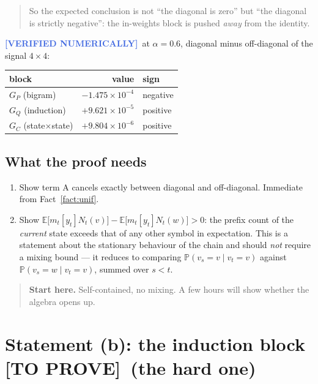 \documentclass[11pt,a4paper]{article}
\theoremstyle{plain}
\theoremstyle{definition}
\newcommand{\TODO}{\textcolor{BrickRed}{\textbf{[TO PROVE]}}}
\newcommand{\NUM}{\textcolor{RoyalBlue}{\textbf{[VERIFIED NUMERICALLY]}}}
\newcommand{\1}{\mathbf{1}}
\newcommand{\E}{\mathbb{E}}
\newcommand{\PP}{\mathbb{P}}
\begin{document}
\begin{quote}
So the expected conclusion is not ``the diagonal is zero'' but ``the diagonal is strictly
negative'': the in-weights block is pushed \emph{away} from the identity.
\end{quote}

\medskip\noindent\NUM\ at $\alpha=0.6$, diagonal minus off-diagonal of the signal $4\times4$:

\begin{center}
\begin{tabular}{@{}lrl@{}}
\toprule
block & value & sign \\
\midrule
$G_P$ (bigram) & $-1.475\times10^{-4}$ & negative \\
$G_Q$ (induction) & $+9.621\times10^{-5}$ & positive \\
$G_C$ (state$\times$state) & $+9.804\times10^{-6}$ & positive \\
\bottomrule
\end{tabular}
\end{center}

\subsection{What the proof needs}

\begin{enumerate}[nosep]
\item Show term A cancels exactly between diagonal and off-diagonal. Immediate from
Fact~\ref{fact:unif}.
\item Show $\E\bigl[m_t[y_t]N_t(v)\bigr]-\E\bigl[m_t[y_t]N_t(w)\bigr]>0$: the prefix count of the
\emph{current} state exceeds that of any other symbol in expectation. This is a statement about
the stationary behaviour of the chain and should \emph{not} require a mixing bound --- it reduces
to comparing $\PP(v_s{=}v\mid v_t{=}v)$ against $\PP(v_s{=}w\mid v_t{=}v)$, summed over $s<t$.
\end{enumerate}

\begin{quote}
\textbf{Start here.} Self-contained, no mixing. A few hours will show whether the algebra opens up.
\end{quote}

\section{Statement (b): the induction block \quad \TODO\ (the hard one)}\label{sec:b}
\end{document}
